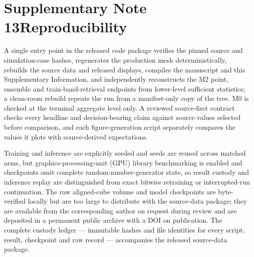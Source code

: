 \documentclass[11pt]{article}
\begin{document}
\clearpage
\section*{Supplementary Note 13\quad Reproducibility}\label{sec:s-repro}

A single entry point in the released code package verifies the pinned source and simulation-case
hashes, regenerates the production mesh deterministically, rebuilds the source data and released
displays, compiles the manuscript and this Supplementary Information, and independently
reconstructs the M2 point, ensemble and train-band-retrieval endpoints from lower-level
sufficient statistics; a clean-room rebuild repeats the run from a manifest-only copy of the tree.
M0 is checked at the terminal aggregate level only. A reviewed source-first contract checks every
headline and decision-bearing claim against source values selected before comparison, and each
figure-generation script separately compares the values it plots with source-derived expectations.

Training and inference are explicitly seeded and seeds are reused across matched arms, but graphics-processing-unit (GPU)
library benchmarking is enabled and checkpoints omit complete random-number-generator state, so
result custody and inference replay are distinguished from exact bitwise retraining or
interrupted-run continuation. The raw aligned-cube volume and model checkpoints are byte-verified
locally but are too large to distribute with the source-data package; they are available from
the corresponding author on request during review and are deposited in a permanent public
archive with a DOI on publication. The complete custody
ledger --- immutable hashes and file identities for every script, result, checkpoint and raw
record --- accompanies the released source-data package.
\end{document}
